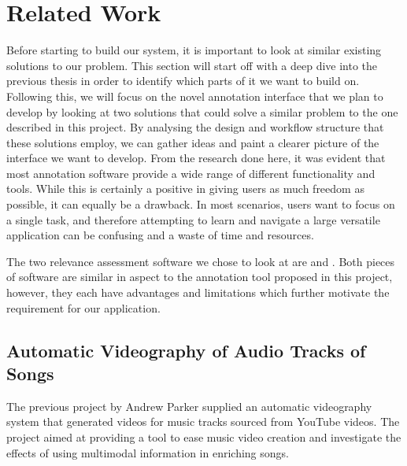 \documentclass{l4proj}
\begin{document}
\section{Related Work}
Before starting to build our system, it is important to look at similar existing solutions to our problem. This section will start off with a deep dive into the previous thesis in order to identify which parts of it we want to build on. Following this, we will focus on the novel annotation interface that we plan to develop by looking at two solutions that could solve a similar problem to the one described in this project. By analysing the design and workflow structure that these solutions employ, we can gather ideas and paint a clearer picture of the interface we want to develop. From the research done here, it was evident that most annotation software provide a wide range of different functionality and tools. While this is certainly a positive in giving users as much freedom as possible, it can equally be a drawback. In most scenarios, users want to focus on a single task, and therefore attempting to learn and navigate a large versatile application can be confusing and a waste of time and resources.

The two relevance assessment software we chose to look at are \cite{labelbox} and \cite{superannotate}. Both pieces of software are similar in aspect to the annotation tool proposed in this project, however, they each have advantages and limitations which further motivate the requirement for our application.

\subsection{Automatic Videography of Audio Tracks of Songs}
\label{sec:background_parker}
The previous project by Andrew Parker supplied an automatic videography system that generated videos for music tracks sourced from YouTube videos. The project aimed at providing a tool to ease music video creation and investigate the effects of using multimodal information in enriching songs.
\end{document}
